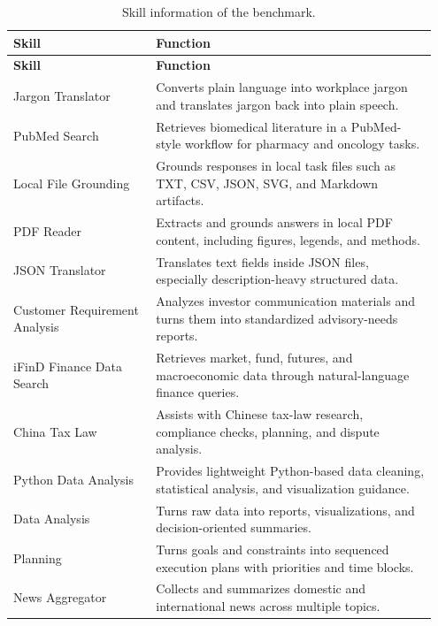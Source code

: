 \documentclass{llmxive}
\begin{document}
\par\medskip
\begingroup
\footnotesize
\setlength{\LTpre}{8pt}
\setlength{\LTpost}{0pt}
\setlength{\tabcolsep}{4pt}
\begin{longtable}{@{}p{0.32\linewidth}p{0.63\linewidth}@{}}
\caption{Skill information of the benchmark.}
\label{tab:benchmark_skills}\\
\toprule
\textbf{Skill} & \textbf{Function} \\
\midrule
\endfirsthead

\toprule
\textbf{Skill} & \textbf{Function} \\
\midrule
\endhead

\endfoot

\bottomrule
\endlastfoot

Jargon Translator & Converts plain language into workplace jargon and translates jargon back into plain speech. \\
PubMed Search & Retrieves biomedical literature in a PubMed-style workflow for pharmacy and oncology tasks. \\
Local File Grounding & Grounds responses in local task files such as TXT, CSV, JSON, SVG, and Markdown artifacts. \\
PDF Reader & Extracts and grounds answers in local PDF content, including figures, legends, and methods. \\
JSON Translator & Translates text fields inside JSON files, especially description-heavy structured data. \\
Customer Requirement Analysis & Analyzes investor communication materials and turns them into standardized advisory-needs reports. \\
iFinD Finance Data Search & Retrieves market, fund, futures, and macroeconomic data through natural-language finance queries. \\
China Tax Law & Assists with Chinese tax-law research, compliance checks, planning, and dispute analysis. \\
Python Data Analysis & Provides lightweight Python-based data cleaning, statistical analysis, and visualization guidance. \\
Data Analysis & Turns raw data into reports, visualizations, and decision-oriented summaries. \\
Planning & Turns goals and constraints into sequenced execution plans with priorities and time blocks. \\
News Aggregator & Collects and summarizes domestic and international news across multiple topics. \\

\end{longtable}
\end{document}
